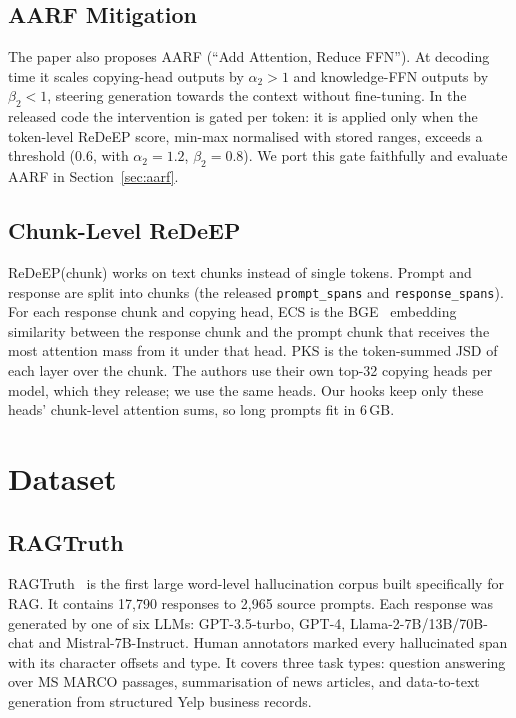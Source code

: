 \documentclass[conference]{IEEEtran}
\begin{document}
\subsection{AARF Mitigation}
The paper also proposes AARF (``Add Attention, Reduce FFN''). At decoding time it scales copying-head outputs by $\alpha_2>1$ and knowledge-FFN outputs by $\beta_2<1$, steering generation towards the context without fine-tuning. In the released code the intervention is gated per token: it is applied only when the token-level ReDeEP score, min-max normalised with stored ranges, exceeds a threshold (0.6, with $\alpha_2=1.2$, $\beta_2=0.8$). We port this gate faithfully and evaluate AARF in Section~\ref{sec:aarf}.

\subsection{Chunk-Level ReDeEP}
ReDeEP(chunk) works on text chunks instead of single tokens. Prompt and response are split into chunks (the released \texttt{prompt\_spans} and \texttt{response\_spans}). For each response chunk and copying head, ECS is the BGE~\cite{bge} embedding similarity between the response chunk and the prompt chunk that receives the most attention mass from it under that head. PKS is the token-summed JSD of each layer over the chunk. The authors use their own top-32 copying heads per model, which they release; we use the same heads. Our hooks keep only these heads' chunk-level attention sums, so long prompts fit in 6\,GB.

\section{Dataset}
\subsection{RAGTruth}
RAGTruth~\cite{niu2024ragtruth} is the first large word-level hallucination corpus built specifically for RAG. It contains 17,790 responses to 2,965 source prompts. Each response was generated by one of six LLMs: GPT-3.5-turbo, GPT-4, Llama-2-7B/13B/70B-chat and Mistral-7B-Instruct. Human annotators marked every hallucinated span with its character offsets and type. It covers three task types: question answering over MS MARCO passages, summarisation of news articles, and data-to-text generation from structured Yelp business records.
\end{document}
